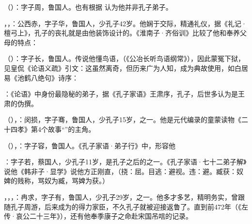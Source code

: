 （）：字子周，鲁国人。也有根据  认为他并非孔子弟子。

，，：公西赤，字子华，鲁国人，少孔子42岁。他娴于交际，精通礼仪，据《礼记·檀弓上》，孔子的丧礼就是由他装饰设计的。《淮南子·齐俗训》比较了他和奉养父母的特点： %

（）：字子长，鲁国人。传说他懂鸟语，（《公冶长听鸟语纲常》），因此蒙冤下狱，见皇侃《论语义疏》引文：这虽然离奇，但历来广为人知，成为典故使用，如白居易《池鹤八绝句》诗序：

：《论语》中身份最隐秘的弟子，据《孔子家语》王肃序，孔子，后世多认为是王肃的伪撰。

（），：闵损，字子骞，鲁国人，少孔子15岁，之一。他是元代编录的童蒙读物《二十四孝》第4个故事“”的主角。

（），：字子容，鲁国人。《孔子家语·弟子行》中，形容他

：字子若，蔡国人，少孔子11岁，是孔子之后的之一。《孔子家语·七十二弟子解》说他《韩非子·显学》说他方正刚直，（挠：屈。目逃：避视。违：避。臧获：奴婢的贱称，骂奴为臧，骂婢为获。）

，，，：冉求，字子有，鲁国人，少孔子29岁，之一。他多才多艺，精明务实，曾跟随孔子周游，后来成为的得力家臣，不久孔子就被迎接返鲁了。直到前472年（《左传·哀公二十三年》），还有他奉季康子之命赴宋国吊唁的记录。

